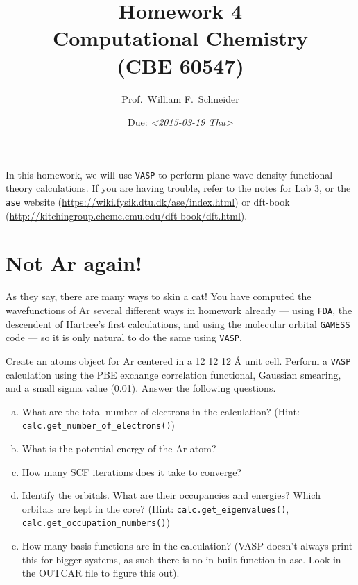 \documentclass[11pt]{article}
\date{Due: \textit{<2015-03-19 Thu>}}
\title{}
\begin{document}
\title{Homework 4\\Computational Chemistry\\(CBE 60547)}
\author{Prof.\ William F.\ Schneider}
\maketitle


In this homework, we will use \texttt{VASP} to perform plane wave density functional theory calculations. If you are having trouble, refer to the notes for Lab 3, or the \texttt{ase} website (\url{https://wiki.fysik.dtu.dk/ase/index.html}) or dft-book (\url{http://kitchingroup.cheme.cmu.edu/dft-book/dft.html}).

\section{Not Ar again! \label{sec:Ar}}
\label{sec-1}

As they say, there are many ways to skin a cat! You have computed the wavefunctions of Ar several different ways in homework already — using \texttt{FDA}, the descendent of Hartree’s first calculations, and using the molecular orbital \texttt{GAMESS} code — so it is only natural to do the same using \texttt{VASP}. 

Create an atoms object for Ar centered in a 12 \texttimes{} 12 \texttimes{} 12 \AA{} unit cell. Perform a \texttt{VASP} calculation using the PBE exchange correlation functional, Gaussian smearing, and a small sigma value (0.01). Answer the following questions.

\begin{enumerate}[(a)]
\item What are the total number of electrons in the calculation? (Hint: \verb~calc.get_number_of_electrons()~)

\item What is the potential energy of the Ar atom?

\item How many SCF iterations does it take to converge?

\item Identify the orbitals. What are their occupancies and energies? Which orbitals are kept in the core? (Hint: \verb~calc.get_eigenvalues()~, \verb~calc.get_occupation_numbers()~)

\item How many basis functions are in the calculation? (VASP doesn't always print this for bigger systems, as such there is no in-built function in ase. Look in the OUTCAR file to figure this out).
\end{enumerate}
\end{document}
